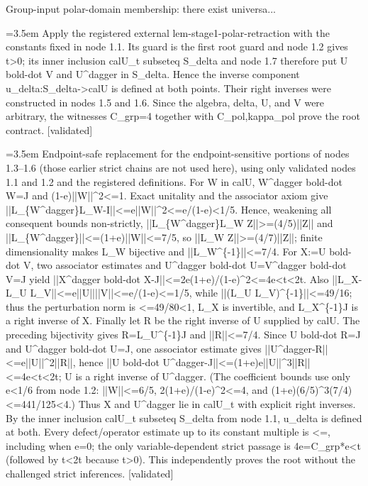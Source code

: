 \documentclass{article}
\newcommand{\step}[1]{\par\noindent\hangindent=3.5em\hangafter=1%
  \makebox[3.5em][l]{\textbf{#1.}}}
\newcommand{\steptag}[1]{\hfill{\small\textsf{[#1]}}}
\begin{document}
\begin{proofbox}{Group-input polar-domain membership: there exist universa...}
\step{1.8} Apply the registered external lem-stage1-polar-retraction with the constants fixed in node 1.1. Its guard is the first root guard and node 1.2 gives t>0; its inner inclusion calU\_t subseteq S\_delta and node 1.7 therefore put U bold-dot V and U\textasciicircum{}dagger in S\_delta. Hence the inverse component u\_delta:S\_delta->calU is defined at both points. Their right inverses were constructed in nodes 1.5 and 1.6. Since the algebra, delta, U, and V were arbitrary, the witnesses C\_grp=4 together with C\_pol,kappa\_pol prove the root contract. \steptag{validated} \\[4pt]
\step{1.9} Endpoint-safe replacement for the endpoint-sensitive portions of nodes 1.3--1.6 (those earlier strict chains are not used here), using only validated nodes 1.1 and 1.2 and the registered definitions. For W in calU, W\textasciicircum{}dagger bold-dot W=J and (1-e)||W||\textasciicircum{}2<=1. Exact unitality and the associator axiom give ||L\_\{W\textasciicircum{}dagger\}L\_W-I||<=e||W||\textasciicircum{}2<=e/(1-e)<1/5. Hence, weakening all consequent bounds non-strictly, ||L\_\{W\textasciicircum{}dagger\}L\_W Z||>=(4/5)||Z|| and ||L\_\{W\textasciicircum{}dagger\}||<=(1+e)||W||<=7/5, so ||L\_W Z||>=(4/7)||Z||; finite dimensionality makes L\_W bijective and ||L\_W\textasciicircum{}\{-1\}||<=7/4. For X:=U bold-dot V, two associator estimates and U\textasciicircum{}dagger bold-dot U=V\textasciicircum{}dagger bold-dot V=J yield ||X\textasciicircum{}dagger bold-dot X-J||<=2e(1+e)/(1-e)\textasciicircum{}2<=4e<t<2t. Also ||L\_X-L\_U L\_V||<=e||U||||V||<=e/(1-e)<=1/5, while ||(L\_U L\_V)\textasciicircum{}\{-1\}||<=49/16; thus the perturbation norm is <=49/80<1, L\_X is invertible, and L\_X\textasciicircum{}\{-1\}J is a right inverse of X. Finally let R be the right inverse of U supplied by calU. The preceding bijectivity gives R=L\_U\textasciicircum{}\{-1\}J and ||R||<=7/4. Since U bold-dot R=J and U\textasciicircum{}dagger bold-dot U=J, one associator estimate gives ||U\textasciicircum{}dagger-R||<=e||U||\textasciicircum{}2||R||, hence ||U bold-dot U\textasciicircum{}dagger-J||<=(1+e)e||U||\textasciicircum{}3||R||<=4e<t<2t; U is a right inverse of U\textasciicircum{}dagger. (The coefficient bounds use only e<1/6 from node 1.2: ||W||<=6/5, 2(1+e)/(1-e)\textasciicircum{}2<=4, and (1+e)(6/5)\textasciicircum{}3(7/4)<=441/125<4.) Thus X and U\textasciicircum{}dagger lie in calU\_t with explicit right inverses. By the inner inclusion calU\_t subseteq S\_delta from node 1.1, u\_delta is defined at both. Every defect/operator estimate up to its constant multiple is <=, including when e=0; the only variable-dependent strict passage is 4e=C\_grp*e<t (followed by t<2t because t>0). This independently proves the root without the challenged strict inferences. \steptag{validated} \\[4pt]
\end{proofbox}
\end{document}
